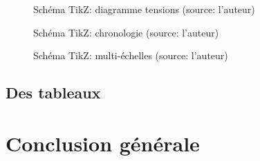\lipsum[19]

\begin{figure}
\centering

\caption[Schéma TikZ: tensions]{Schéma TikZ: diagramme tensions (source: l'auteur)}\label{fig:tikztensions}
\end{figure}

\lipsum[20]

\lipsum[21]

\begin{figure}

\caption[Schéma TikZ: chronologie]{Schéma TikZ: chronologie (source: l'auteur) 
}\label{fig:tikztemps}
\end{figure}

\begin{figure}

\caption[Schéma TikZ: multi-échelles]{Schéma TikZ: multi-échelles (source: l'auteur)}\label{fig:tikzsources}
\end{figure}

\lipsum[22]

\lipsum[23]

\section[Des tableaux ]{Des tableaux}\label{sec:24}

\lipsum[24]



\lipsum[25]



\cleardoublepage 
{}
{}
\chapter*{Conclusion générale \label{chap:conclu}}
\lipsum[5-6]

\appendix
\cleardoublepage 


\backmatter
\cleardoublepage 
\pagestyle{scrheadings} 



